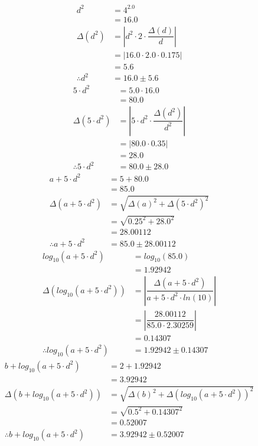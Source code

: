 \documentclass[a4paper]{article}
\begin{document}
\begin{align*}
d ^ { 2 } &= 4 ^ { 2.0 } \\
&= 16.0 \\[4mm]
\Delta \left( d ^ { 2 } \right) &= \left| d ^ { 2 } \cdot 2 \cdot \dfrac{ \Delta \left( d \right) }{ d } \right| \\
&= \left| 16.0 \cdot 2.0 \cdot 0.175 \right| \\
&= 5.6\\[4mm]
\therefore d ^ { 2 } &= 16.0 \pm 5.6
\end{align*}
\begin{align*}
5 \cdot d ^ { 2 } &= 5.0 \cdot 16.0 \\
&= 80.0 \\[4mm]
\Delta \left( 5 \cdot d ^ { 2 } \right) &= \left| 5 \cdot d ^ { 2 } \cdot \dfrac{ \Delta \left( d ^ { 2 } \right) }{ d ^ { 2 } } \right| \\
&= \left| 80.0 \cdot 0.35 \right| \\
&= 28.0\\[4mm]
\therefore 5 \cdot d ^ { 2 } &= 80.0 \pm 28.0
\end{align*}
\begin{align*}
a + 5 \cdot d ^ { 2 } &= 5 + 80.0 \\
&= 85.0 \\[4mm]
\Delta \left( a + 5 \cdot d ^ { 2 } \right) &= \sqrt{ \Delta \left( a \right) ^ { 2 } + \Delta \left( 5 \cdot d ^ { 2 } \right) ^ { 2 }} \\
&= \sqrt{ 0.25 ^ { 2 } + 28.0 ^ { 2 }} \\
&= 28.00112\\[4mm]
\therefore a + 5 \cdot d ^ { 2 } &= 85.0 \pm 28.00112
\end{align*}
\begin{align*}
log_{ 10 }\left( a + 5 \cdot d ^ { 2 } \right) &= log_{ 10 }\left( 85.0 \right) \\
&= 1.92942 \\[4mm]
\Delta \left( log_{ 10 }\left( a + 5 \cdot d ^ { 2 } \right) \right) &= \left| \dfrac{ \Delta \left( a + 5 \cdot d ^ { 2 } \right) }{ a + 5 \cdot d ^ { 2 } \cdot ln \left( 10 \right) } \right| \\
&= \left| \dfrac{ 28.00112 }{ 85.0 \cdot 2.30259 } \right| \\
&= 0.14307\\[4mm]
\therefore log_{ 10 }\left( a + 5 \cdot d ^ { 2 } \right) &= 1.92942 \pm 0.14307
\end{align*}
\begin{align*}
b + log_{ 10 }\left( a + 5 \cdot d ^ { 2 } \right) &= 2 + 1.92942 \\
&= 3.92942 \\[4mm]
\Delta \left( b + log_{ 10 }\left( a + 5 \cdot d ^ { 2 } \right) \right) &= \sqrt{ \Delta \left( b \right) ^ { 2 } + \Delta \left( log_{ 10 }\left( a + 5 \cdot d ^ { 2 } \right) \right) ^ { 2 }} \\
&= \sqrt{ 0.5 ^ { 2 } + 0.14307 ^ { 2 }} \\
&= 0.52007\\[4mm]
\therefore b + log_{ 10 }\left( a + 5 \cdot d ^ { 2 } \right) &= 3.92942 \pm 0.52007
\end{align*}
\end{document}
